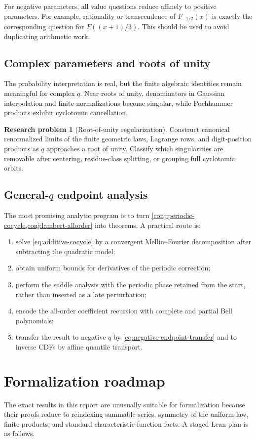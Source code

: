 \documentclass[11pt,oneside]{article}
\theoremstyle{definition}
\newtheorem{problem}[theorem]{Research problem}
\theoremstyle{remark}
\begin{document}
For negative parameters, all value questions reduce affinely to positive
parameters.  For example, rationality or transcendence of
\(F_{-1/2}(x)\) is exactly the corresponding question for
\(F((x+1)/3)\).  This should be used to avoid duplicating arithmetic work.

\subsection{Complex parameters and roots of unity}
The probability interpretation is real, but the finite algebraic identities
remain meaningful for complex \(q\).  Near roots of unity, denominators in
Gaussian interpolation and finite normalizations become singular, while
Pochhammer products exhibit cyclotomic cancellation.

\begin{problem}[Root-of-unity regularization]
Construct canonical renormalized limits of the finite geometric laws,
Lagrange rows, and digit-position products as \(q\) approaches a root of unity.
Classify which singularities are removable after centering, residue-class
splitting, or grouping full cyclotomic orbits.
\end{problem}

\subsection{General-\texorpdfstring{\(q\)}{q} endpoint analysis}
The most promising analytic program is to turn
\cref{conj:periodic-cocycle,conj:lambert-allorder} into theorems.  A practical
route is:
\begin{enumerate}
\item solve \eqref{eq:additive-cocycle} by a convergent Mellin--Fourier
  decomposition after subtracting the quadratic model;
\item obtain uniform bounds for derivatives of the periodic correction;
\item perform the saddle analysis with the periodic phase retained from the
  start, rather than inserted as a late perturbation;
\item encode the all-order coefficient recursion with complete and partial Bell
  polynomials;
\item transfer the result to negative \(q\) by
  \eqref{eq:negative-endpoint-transfer} and to inverse CDFs by affine quantile
  transport.
\end{enumerate}

\section{Formalization roadmap}
The exact results in this report are unusually suitable for formalization
because their proofs reduce to reindexing summable series, symmetry of the
uniform law, finite products, and standard characteristic-function facts.
A staged Lean plan is as follows.
\end{document}
